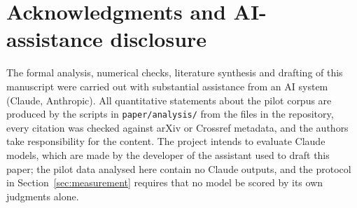 \documentclass[11pt]{article}
\theoremstyle{plain}
\theoremstyle{definition}
\theoremstyle{remark}
\begin{document}
\section*{Acknowledgments and AI-assistance disclosure}
The formal analysis, numerical checks, literature synthesis and drafting of this manuscript were carried out with substantial assistance from an AI system (Claude, Anthropic).
All quantitative statements about the pilot corpus are produced by the scripts in \texttt{paper/analysis/} from the files in the repository, every citation was checked against arXiv or Crossref metadata, and the authors take responsibility for the content.
The project intends to evaluate Claude models, which are made by the developer of the assistant used to draft this paper; the pilot data analysed here contain no Claude outputs, and the protocol in Section~\ref{sec:measurement} requires that no model be scored by its own judgments alone.




\clearpage
\appendix

\end{document}
